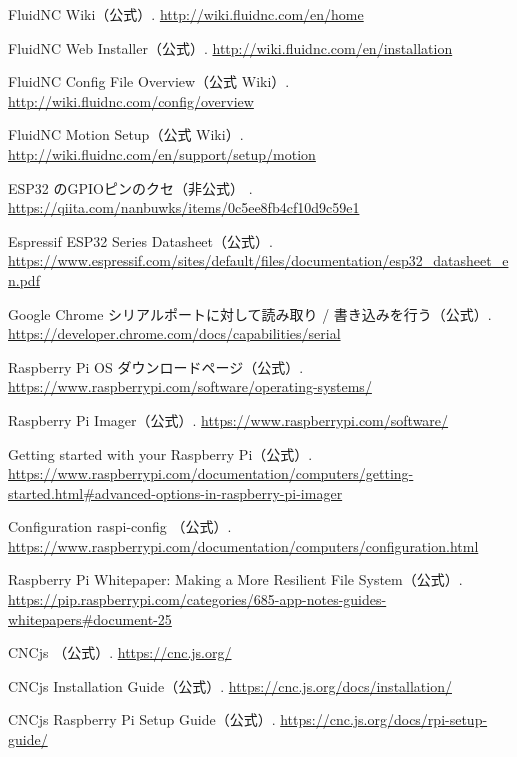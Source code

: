 \documentclass[uplatex,dvipdfmx]{ujarticle}
\begin{document}
\begin{thebibliography}{999}

FluidNC Wiki（公式）.  
\url{http://wiki.fluidnc.com/en/home}


FluidNC Web Installer（公式）.  
\url{http://wiki.fluidnc.com/en/installation}

FluidNC Config File Overview（公式 Wiki）.  
\url{http://wiki.fluidnc.com/config/overview}

FluidNC Motion Setup（公式 Wiki）.  
\url{http://wiki.fluidnc.com/en/support/setup/motion}

ESP32 のGPIOピンのクセ（非公式） . 
\url{https://qiita.com/nanbuwks/items/0c5ee8fb4cf10d9c59e1}

Espressif ESP32 Series Datasheet（公式）.  
\url{https://www.espressif.com/sites/default/files/documentation/esp32_datasheet_en.pdf}

Google Chrome シリアルポートに対して読み取り / 書き込みを行う（公式）.  
\url{https://developer.chrome.com/docs/capabilities/serial}

Raspberry Pi OS ダウンロードページ（公式）.  
\url{https://www.raspberrypi.com/software/operating-systems/}

Raspberry Pi Imager（公式）.  
\url{https://www.raspberrypi.com/software/}

Getting started with your Raspberry Pi（公式）.  
\url{https://www.raspberrypi.com/documentation/computers/getting-started.html#advanced-options-in-raspberry-pi-imager}

Configuration raspi-config （公式）.  
\url{https://www.raspberrypi.com/documentation/computers/configuration.html}

Raspberry Pi Whitepaper: Making a More Resilient File System（公式）.  
\url{https://pip.raspberrypi.com/categories/685-app-notes-guides-whitepapers#document-25}

CNCjs （公式）.  
\url{https://cnc.js.org/}

CNCjs Installation Guide（公式）.  
\url{https://cnc.js.org/docs/installation/}

CNCjs Raspberry Pi Setup Guide（公式）.  
\url{https://cnc.js.org/docs/rpi-setup-guide/}


\end{thebibliography}
\end{document}

